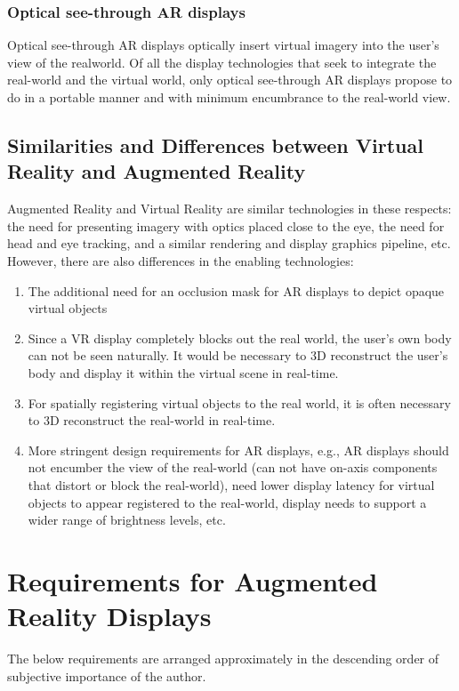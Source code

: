 \subsubsection{Optical see-through AR displays}
\label{sec:background:ost_displays}
Optical see-through AR displays optically insert virtual imagery into the user’s view of the realworld. 
Of all the display technologies that seek to integrate the real-world and the virtual world, only optical see-through AR displays propose to do in a portable manner and with minimum encumbrance to the real-world view.

\subsection{Similarities and Differences between Virtual Reality and Augmented Reality}
\label{sec:background:ar_vs_vr_displays}

Augmented Reality and Virtual Reality are similar technologies in these respects: the need for presenting imagery with optics placed close to the eye, the need for head and eye tracking, and a similar rendering and display graphics pipeline, etc. 
However, there are also differences in the enabling technologies:

\begin{enumerate}
    \item The additional need for an occlusion mask for AR displays to depict opaque virtual objects
    \item Since a VR display completely blocks out the real world, the user’s own body can not be seen naturally. It would be necessary to 3D reconstruct the user’s body and display it within the virtual scene in real-time.
    \item For spatially registering virtual objects to the real world, it is often necessary to 3D reconstruct the real-world in real-time.
    \item More stringent design requirements for AR displays, e.g., AR displays should not encumber the view of the real-world (can not have on-axis components that distort or block the real-world), need lower display latency for virtual objects to appear registered to the real-world, display needs to support a wider range of brightness levels, etc. 
\end{enumerate}

\section{Requirements for Augmented Reality Displays}
\label{sec:background:requirements_ar_displays}
The below requirements are arranged approximately in the descending order of subjective importance of the author.

